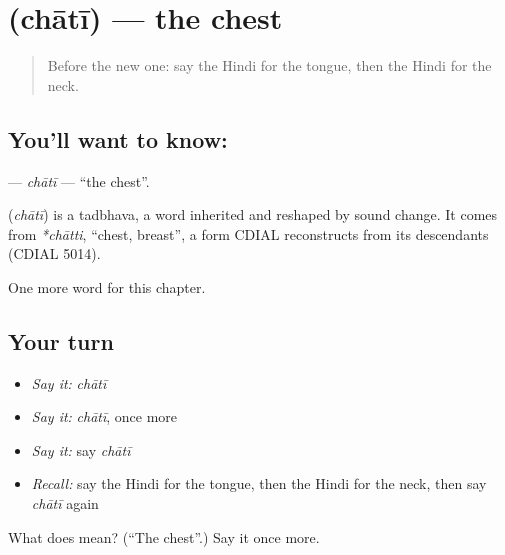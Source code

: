 \section[\texorpdfstring{\hi{छाती} (chātī)}{छाती (chātī)}]{ (chātī) — the chest}

\label{lesson:HI-C151-chati}



\begin{quote}
Before the new one: say the Hindi for the tongue, then the Hindi for the neck.
\end{quote}

\subsection*{You'll want to know: }
\textbf{} — \emph{chātī} — \textquotedblleft{}the chest\textquotedblright{}.

\begin{cousinweb}
\textbf{} (\emph{chātī}) is a tadbhava, a word inherited and reshaped by sound change. It comes from \emph{*chātti}, \textquotedblleft{}chest, breast\textquotedblright{}, a form CDIAL reconstructs from its descendants (CDIAL 5014).
\end{cousinweb}

\begin{grammarlens}[title={What you've built}]
One more word for this chapter.
\end{grammarlens}

\subsection*{Your turn}
\begin{itemize}
\raggedright
  \item \emph{Say it:} \emph{chātī}
  \item \emph{Say it:} \emph{chātī}, once more
  \item \emph{Say it:} say \emph{chātī}
  \item \emph{Recall:} say the Hindi for the tongue, then the Hindi for the neck, then say \emph{chātī} again
\end{itemize}

\begin{tcolorbox}[breakable,colback=teal!4,colframe=teal!35!black,title={Before you move on}]
What does  mean? (\textquotedblleft{}The chest\textquotedblright{}.) Say it once more.
\end{tcolorbox}

